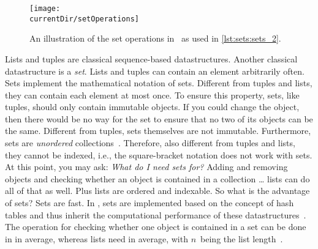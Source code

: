 %
\label{sec:sets}%
%
%
%
%
%
\begin{figure}%
\centering%
\texttt{[image: \\currentDir/setOperations]}%
\caption{An illustration of the set operations in \python\ as used in \cref{lst:sets:sets_2}.}%
\label{fig:setOperations}%
\end{figure}%
%
Lists and tuples are classical sequence-based datastructures.
Another classical datastructure is a \emph{set}.
Lists and tuples can contain an element arbitrarily often.
Sets implement the mathematical notation of sets.
Different from tuples and lists, they can contain each element at most once.
To ensure this property, sets, like tuples, should only contain immutable objects.
If you could change the object, then there would be no way for the set to ensure that no two of its objects can be the same.%
%
%
%
Different from tuples, sets themselves are not immutable.
Furthermore, sets are \emph{unordered} collections~\cite{PSF2024STSF}.
Therefore, also different from tuples and lists, they cannot be indexed, i.e., the square-bracket notation does not work with sets.%
%
%
%
At this point, you may ask:
\emph{What do I need sets for?}
Adding and removing objects and checking whether an object is contained in a collection {\dots} lists can do all of that as well.
Plus lists are ordered and indexable.
So what is the advantage of sets?
Sets are fast.
In \python, sets are implemented based on the concept of hash tables and thus inherit the computational performance of these datastructures~\cite{K1998SAS,CLRS2009ITA,SKS2019DSC}.
The operation for checking whether one object is contained in a set can be done in  in average, whereas lists need  in average, with $n$~being the list length~\cite{H2024PBOTTCODDSIPP33,B2023T,N2022CCSFPO}.
